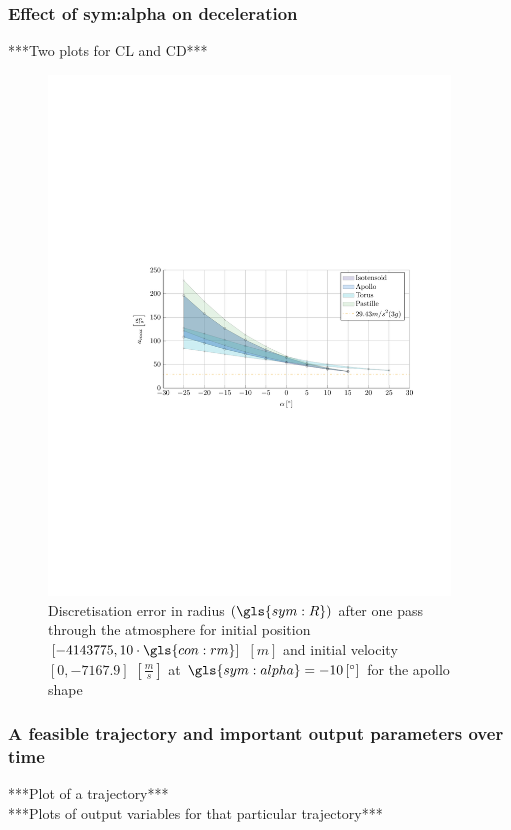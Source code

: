 \subsubsection{Effect of \gls{sym:alpha} on deceleration}
\label{sec:astrodec}
***Two plots for CL and CD***\\
\begin{figure}[h]
	\centering
	\includegraphics[trim={4.25cm 10.5cm 1cm 10.5cm},clip,width=0.95\textwidth]{Figure/orbital_model/n_alpha.pdf}
	\caption{Discretisation error in radius $\left(\gls{sym:R}\right)$ after one pass through the atmosphere for initial position $\left[-4143775,10\cdot\gls{con:rm}\right]$ $\left[m\right]$ and initial velocity $\left[0,-7167.9\right]$ $\left[\frac{m}{s}\right]$ at $\gls{sym:alpha}=-10\left[^\circ\right]$ for the apollo shape}
	\label{fig:n_alpha}
\end{figure}


\subsubsection{A feasible trajectory and important output parameters over time}
\label{sec:astrorestraj}
***Plot of a trajectory***\\
***Plots of output variables for that particular trajectory***\\

